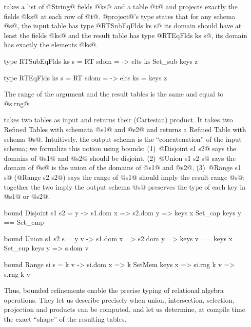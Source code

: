  takes
a list of @String@ fields @ks@ 
and a table @t@ and projects 
exactly the fields @ks@ at 
each row of @t@.
%
@project@'s type states that for 
any schema @s@, the input table 
has type @RTSubEqFlds ks s@ 
\ie its domain should have at 
least the fields @ks@ and the 
result table has type @RTEqFlds ks s@, 
\ie its domain has exactly the elements @ks@. 
%
\begin{code}
  type RTSubEqFlds ks s = RT s{dom = \z -> elts ks Set_sub  keys z}

  type RTEqFlds ks s    = RT s{dom = \z -> elts ks = keys z}
\end{code}
% 
The range of the argument and the result tables 
is the same and equal to @s.rng@.

 takes two tables 
as input and returns their (Cartesian) 
product.
%
It takes two Refined Tables with schemata 
@s1@ and @s2@ and returns a Refined Table 
with schema @s@. Intuitively, the output
schema is the ``concatenation'' of the input
schema; we formalize this notion using bounds:
%
(1)~@Disjoint s1 s2@ says the domains of 
    @s1@ and @s2@ should be disjoint,
%
(2)~@Union s1 s2 s@ says the domain of @s@ 
    is the union of the domains of @s1@ and @s2@, 
%
(3)~@Range s1 s@ (\resp @Range s2 s2@) says 
    the range of @s1@ should imply the result 
    range @s@; together the two imply the output
    schema @s@ preserves the type of each key in 
    @s1@ or @s2@.
%
\begin{code}
  bound Disjoint s1 s2 = \x y -> 
    s1.dom x => s2.dom y => keys x Set_cap keys y == Set_emp
   
  bound Union s1 s2 s = \x y v -> 
    s1.dom x => s2.dom y 
             => keys v == keys x Set_cup keys y 
             => s.dom v

  bound Range si s = \x k v -> 
    si.dom x => k SetMem keys x => si.rng k v => s.rng k v 
\end{code}


Thus, bounded refinements  enable the precise 
typing of  relational algebra operations.
They let us describe precisely when union, 
intersection, selection, projection and products 
can be computed, and let us determine, at compile
time the exact ``shape'' of the resulting tables.


